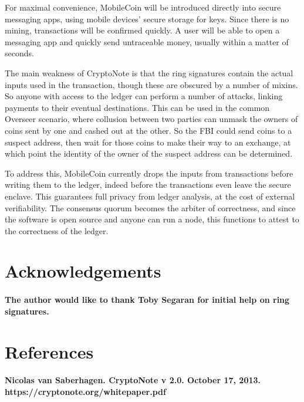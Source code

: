 \documentclass{article}
\begin{document}
For maximal convenience, MobileCoin will be introduced directly into secure messaging apps, using mobile devices’ secure storage for keys.  Since there is no mining, transactions will be confirmed quickly.  A user will be able to open a messaging app and quickly send untraceable money, usually within a matter of seconds.

The main weakness of CryptoNote is that the ring signatures contain the actual inputs used in the transaction, though these are obscured by a number of mixins.  So anyone with access to the ledger can perform a number of attacks, linking payments to their eventual destinations.  This can be used in the common Overseer scenario, where collusion between two parties can unmask the owners of coins sent by one and cashed out at the other.  So the FBI could send coins to a suspect address, then wait for those coins to make their way to an exchange, at which point the identity of the owner of the suspect address can be determined.

To address this, MobileCoin currently drops the inputs from transactions before writing them to the ledger, indeed before the transactions even leave the secure enclave.  This guarantees full privacy from ledger analysis, at the cost of external verifiability.  The consensus quorum becomes the arbiter of correctness, and since the software is open source and anyone can run a node, this functions to attest to the correctness of the ledger.



\section{Acknowledgements}

\paragraph{The author would like to thank Toby Segaran for initial help on ring signatures.}



\section{References}

\paragraph{Nicolas van Saberhagen. CryptoNote v 2.0. October 17, 2013. https://cryptonote.org/whitepaper.pdf}
\end{document}
